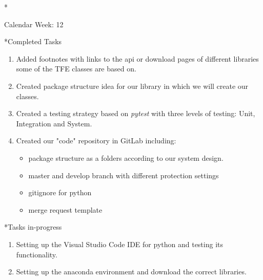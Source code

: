 \documentclass[11pt,a4paper]{article}
\begin{document}
\newpage
\begin{section}*{Calendar Week: 12 \hfill \date{26 March, 2021}}
	
	\begin{subsection}*{Completed Tasks}
		\begin{enumerate}
			\item Added footnotes with links to the api or download pages of different libraries some of the TFE classes are based on.
			\item Created package structure idea for our library in which we will create our classes.
			\item Created a testing strategy based on \textit{pytest} with three levels of testing: Unit, Integration and System.
			\item Created our "code" repository in GitLab including:
			\begin{itemize}
				\item package structure as a folders according to our system design.
				\item master and develop branch with different protection settings
				\item gitignore for python
				\item merge request template 
			\end{itemize}
		\end{enumerate}
	\end{subsection}
	
	\begin{subsection}*{Tasks in-progress}
		\begin{enumerate}
			\item Setting up the Visual Studio Code IDE for python and testing its functionality.
			\item Setting up the anaconda environment and download the correct libraries.
		\end{enumerate}
	\end{subsection}
	
\end{section}
\end{document}
